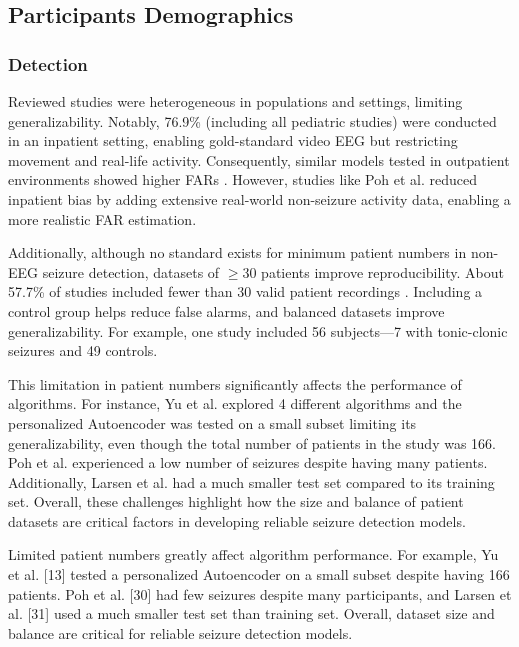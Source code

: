 \subsection{Participants Demographics}
\subsubsection{Detection}
Reviewed studies were heterogeneous in populations and settings, limiting generalizability. Notably, 76.9\% (including all pediatric studies) were conducted in an inpatient setting, enabling gold-standard video EEG but restricting movement and real-life activity. Consequently, similar models tested in outpatient environments showed higher FARs \cite{Wang2022-lt,Chowdhury2022-bi,Nasseri2021-xn,Regalia2019-ch}. However, studies like Poh et al. \cite{Poh2012-af} reduced inpatient bias by adding extensive real-world non-seizure activity data, enabling a more realistic FAR estimation.

Additionally, although no standard exists for minimum patient numbers in non-EEG seizure detection, datasets of $\ge$30 patients improve reproducibility. About 57.7\% of studies included fewer than 30 valid patient recordings \cite{Cogan2017-lg,Hamlin2021-sd,Wang2022-lt,De_Cooman2018-pq,Wu2024-yl,Chowdhury2022-bi,Ge2023-ab,Nasseri2021-xn,Ali2020-ke,Larsen2024-vn,Dong2022-oo,Li2022-ty,Xu2022-tx,Wang2025-ql,Arends2018-ew}. Including a control group helps reduce false alarms, and balanced datasets improve generalizability. For example, one study \cite{Milosevic2016-ee} included 56 subjects—7 with tonic-clonic seizures and 49 controls.

This limitation in patient numbers significantly affects the performance of algorithms. For instance, Yu et al. \cite{Yu2023-ss} explored 4 different algorithms and the personalized Autoencoder was tested on a small subset limiting its generalizability, even though the total number of patients in the study was 166. Poh et al. \cite{Poh2012-af} experienced a low number of seizures despite having many patients. Additionally, Larsen et al. \cite{Larsen2024-vn} had a much smaller test set compared to its training set. Overall, these challenges highlight how the size and balance of patient datasets are critical factors in developing reliable seizure detection models.

Limited patient numbers greatly affect algorithm performance. For example, Yu et al. [13] tested a personalized Autoencoder on a small subset despite having 166 patients. Poh et al. [30] had few seizures despite many participants, and Larsen et al. [31] used a much smaller test set than training set. Overall, dataset size and balance are critical for reliable seizure detection models.


